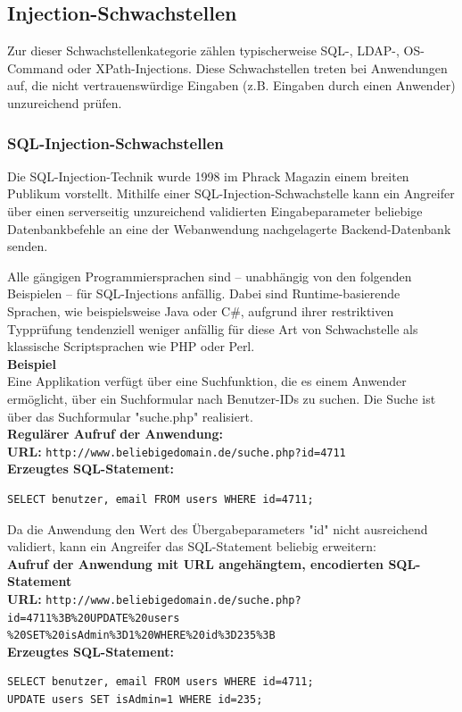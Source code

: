 \subsection{Injection-Schwachstellen}

Zur dieser Schwachstellenkategorie zählen typischerweise SQL-, LDAP-, 
OS-Command oder XPath-Injections. Diese Schwachstellen treten bei 
Anwendungen auf, die nicht vertrauenswürdige Eingaben 
(z.B. Eingaben durch einen Anwender) unzureichend prüfen.


\subsubsection{SQL-Injection-Schwachstellen}

Die SQL-Injection-Technik wurde 1998 im Phrack Magazin \cite{rfp_nt_1998}
einem breiten Publikum vorstellt. Mithilfe einer SQL-Injection-Schwachstelle 
kann ein Angreifer über einen serverseitig unzureichend 
validierten Eingabeparameter beliebige Datenbankbefehle an eine der 
Webanwendung nachgelagerte Backend-Datenbank senden.

Alle gängigen Programmiersprachen sind – unabhängig von den folgenden 
Beispielen – für SQL-Injections anfällig. Dabei sind Runtime-basierende 
Sprachen, wie beispielsweise Java oder C\#, aufgrund ihrer  restriktiven 
Typprüfung tendenziell weniger anfällig für diese Art von Schwachstelle 
als klassische Scriptsprachen wie PHP oder Perl.
\\
\mbox{}
\textbf{Beispiel}
\\
Eine Applikation verfügt über eine Suchfunktion, die es einem Anwender 
ermöglicht, über ein Suchformular nach Benutzer-IDs zu suchen. 
Die Suche ist über das Suchformular "suche.php" realisiert.
\\
\mbox{}
\textbf{Regulärer Aufruf der Anwendung:}
\mbox{}
\\
\textbf{URL:} \texttt{http://www.beliebigedomain.de/suche.php?id=4711}
\\
\textbf{Erzeugtes SQL-Statement:}
\begin{lstlisting}[basicstyle=\ttfamily\footnotesize]
SELECT benutzer, email FROM users WHERE id=4711;
\end{lstlisting}
Da die Anwendung den Wert des Übergabeparameters "id" nicht ausreichend validiert, kann ein Angreifer das SQL-Statement beliebig erweitern:
\\
\textbf{Aufruf der Anwendung mit URL angehängtem, encodierten SQL-Statement}
\\
\textbf{URL:} \texttt{http://www.beliebigedomain.de/suche.php?id=4711\%3B\%20UPDATE\%20users\\\%20SET\%20isAdmin\%3D1\%20WHERE\%20id\%3D235\%3B}
\\
\textbf{Erzeugtes SQL-Statement:}
\begin{lstlisting}[basicstyle=\ttfamily\footnotesize]
SELECT benutzer, email FROM users WHERE id=4711; 
UPDATE users SET isAdmin=1 WHERE id=235;
\end{lstlisting}


